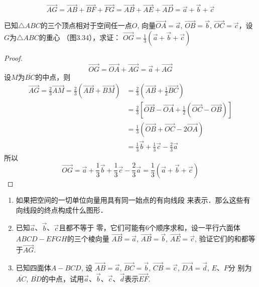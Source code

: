 \begin{solution}
\[\Vec{AG}=\Vec{AB}+\Vec{BF}+\Vec{FG}=\Vec{AB}+\Vec{AE}+\Vec{AD}=\vec{a}+\vec{b}+\vec{c}\]
\end{solution}

\begin{example}
    已知$\triangle ABC$的三个顶点相对于空间任一点$O$, 
 向量$\Vec{OA}=\vec{a}$, $\vec{OB}=\vec{b}$, $\Vec{OC}=\vec{c}$，设$G$为$\triangle ABC$的重心
    （图3.34），求证：
$\Vec{OG}=\frac{1}{3}\left(\vec{a}+\vec{b}+\vec{c}\right)$
\end{example}

\begin{figure}[htp]
    \centering
{}
    \caption{}
\end{figure}


\begin{proof}
\[\Vec{OG}=\Vec{OA}+\Vec{AG}=\vec{a}+\Vec{AG}\]
设$M$为$\overline{BC}$的中点，则
\[\begin{split}
\Vec{AG}=\frac{2}{3}\Vec{AM}=\frac{2}{3}\left(\Vec{AB}+\Vec{BM}\right)&=\frac{2}{3}\left(\Vec{AB}+\frac{1}{2}\Vec{BC}\right)\\
&=\frac{2}{3}\left[\Vec{OB}-\Vec{OA}+\frac{1}{2}\left(\Vec{OC}-\Vec{OB}\right)\right]\\
&=\frac{1}{3}\left(\Vec{OB}+\Vec{OC}-2\Vec{OA}\right)\\
&=\frac{1}{3}\vec{b}+\frac{1}{3}\vec{c}-\frac{2}{3}\vec{a}
\end{split}\]
所以
\[\Vec{OG}=\vec{a}+\frac{1}{3}\vec{b}+\frac{1}{3}\vec{c}-\frac{2}{3}\vec{a}=\frac{1}{3}\left(\vec{a}+\vec{b}+\vec{c}\right)\]
\end{proof}

\begin{ex}
    \begin{enumerate}
        \item 如果把空间的一切单位向量用具有同一始点的有向线段
        来表示．那么这些有向线段的终点构成什么图形．
\item 已知$\vec{a}$、$\vec{b}$、$\vec{c}$且都不等于
零，它们可能有6个顺序求和，设一平行六面体$ABCD
-EFGH$的三个棱向量
$\Vec{AB}=\vec{a}$, $\Vec{AB}=\vec{b}$, $\Vec{AE}=\vec{c}$, 验证它们的和都等于$\Vec{AG}$.
\item 已知四面体$A-BCD$, 设
$\Vec{AB}=\vec{a}$, $\Vec{BC}=\vec{b}$, $\Vec{CB}=\vec{c}$, $\Vec{DA}=\vec{d}$, $E$、$F$分
别为$\overline{AC}$, $\overline{BD}$的中点，试用$\vec{a}$、$\vec{b}$、$\vec{c}$、$\vec{d}$表示$\Vec{EF}$.
    \end{enumerate}
\end{ex}

